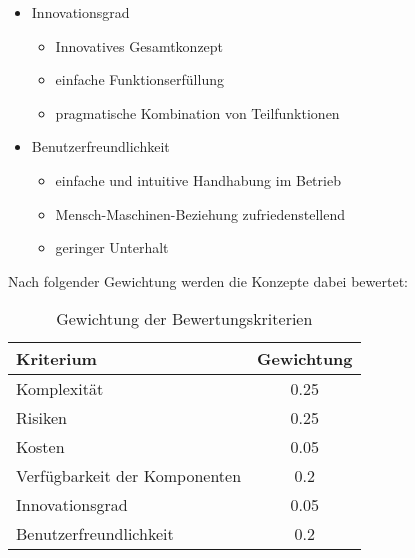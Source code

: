 \begin{itemize}
	\item Innovationsgrad
	\begin{itemize}
	\item Innovatives Gesamtkonzept
	
	\item einfache Funktionserfüllung
	
	\item pragmatische Kombination von Teilfunktionen
	\end{itemize}

	\item Benutzerfreundlichkeit
	\begin{itemize}
	\item einfache und intuitive Handhabung im Betrieb	
		
	\item Mensch-Maschinen-Beziehung zufriedenstellend
	
	\item geringer Unterhalt
	
	\end{itemize}

\end{itemize}

Nach folgender Gewichtung werden die Konzepte dabei bewertet:
\begin{table}[H]
	\begin{tabular}{|l|c|}
	\hline 
	\textbf{Kriterium} & \textbf{Gewichtung} \\ 
	\hline 
	Komplexität & 0.25 \\ 
	\hline 
	Risiken & 0.25 \\ 
	\hline 
	Kosten & 0.05 \\ 
	\hline 
	Verfügbarkeit der Komponenten & 0.2 \\ 
	\hline 
	Innovationsgrad & 0.05 \\ 
	\hline 
	Benutzerfreundlichkeit & 0.2 \\ 
	\hline 
	\end{tabular} 
	\caption{Gewichtung der Bewertungskriterien}
	\label{tab:gewichtung}
\end{table}